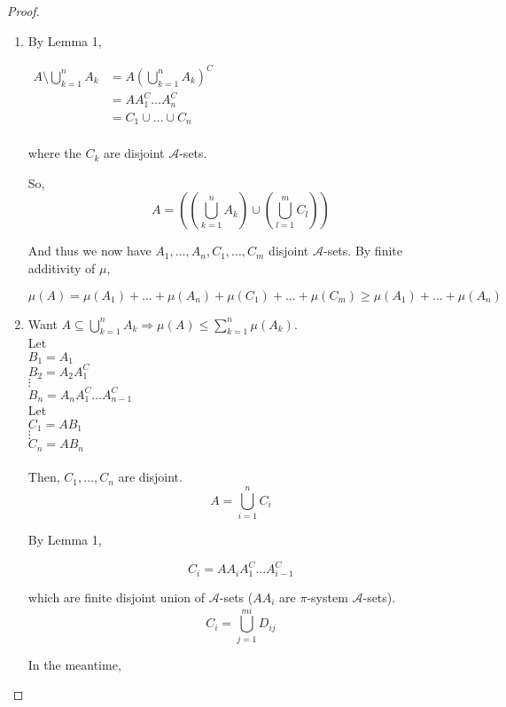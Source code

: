 \documentclass[11pt,fleqn]{book} %
\begin{document}
\begin{proof}
	\begin{enumerate}
		\item By Lemma 1, 

				$\begin{aligned}
					A \setminus \bigcup^n_{k=1} A_k &= A ( \bigcup^n_{k=1} A_k)^C \\
							&= A A_1^C\dots A_n^C\\
							&= C_1 \cup \dots \cup C_n\\
				\end{aligned}$

				where the $C_k$ are disjoint $\mathcal{A}$-sets. 

			So, 
				$$A = ((\bigcup^n_{k=1} A_k) \cup (\bigcup^m_{l=1} C_l)) $$

			And thus we now have $A_1, \dots, A_n, C_1, \dots, C_m$ disjoint $\mathcal{A}$-sets. By finite additivity of $\mu$, 

					$$\mu(A) = \mu(A_1) + \dots + \mu(A_n) + \mu(C_1) + \dots + \mu(C_m) \geq \mu(A_1) + \dots + \mu(A_n)  $$

		\item Want $A \subseteq \bigcup^n_{k=1} A_k \Rightarrow \mu(A) \leq \sum^n_{k=1} \mu(A_k)$.\\


		Let \\
			$B_1 = A_1$\\
			$B_2 = A_2 A_1^C$\\
			$\vdots$\\
			$B_n = A_n A_1^C \dots A_{n-1}^C$
\\
		Let \\
			$C_1 = A B_1$\\
			$\vdots$\\
			$C_n = A B_n$\\
\\

	Then, $C_1, \dots, C_n$ are disjoint. \\

			$$ A = \bigcup^n_{i=1} C_i $$


	By Lemma 1, 

			$$ C_i = A A_i A_1^C \dots A^C_{i-1} $$


	which are finite disjoint union of $\mathcal{A}$-sets ($A A_i$ are $\pi$-system $\mathcal{A}$-sets). \\
	

			$$C_i = \bigcup^{mi}_{j=1} D_{ij} $$

	In the meantime, 


\end{enumerate}
\end{proof}
\end{document}

